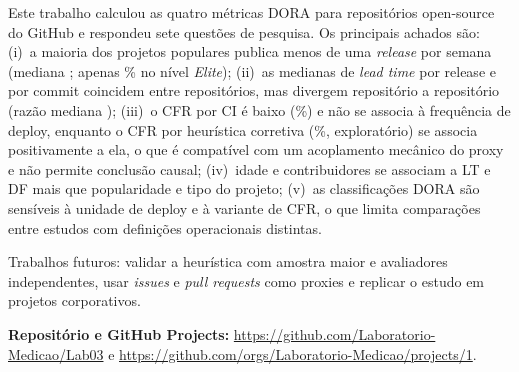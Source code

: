 \documentclass[12pt]{article}
\begin{document}
Este trabalho calculou as quatro métricas DORA para \NTotal{} repositórios open-source do GitHub
e respondeu sete questões de pesquisa. Os principais achados são: (i)~a maioria dos projetos
populares publica menos de uma \textit{release} por semana (mediana \NDfMed{}; apenas \NDfClasseElite\% no
nível \textit{Elite}); (ii)~as medianas de \textit{lead time} por release e por commit coincidem
entre repositórios, mas divergem repositório a repositório (razão mediana \NRazMed{}); (iii)~o CFR por CI é
baixo (\NCfraMed\%) e não se associa à frequência de deploy, enquanto o CFR por heurística corretiva
(\NCfrbMed\%, exploratório) se associa positivamente a ela, o que é compatível com um acoplamento mecânico
do proxy e não permite conclusão causal; (iv)~idade e contribuidores se associam a LT e DF mais que
popularidade e tipo do projeto; (v)~as classificações DORA são sensíveis à unidade de deploy e à variante de
CFR, o que limita comparações entre estudos com definições operacionais distintas.

Trabalhos futuros: validar a heurística com amostra maior e avaliadores independentes, usar \textit{issues} e
\textit{pull requests} como proxies e replicar o estudo em projetos corporativos.

\textbf{Repositório e GitHub Projects:} \url{https://github.com/Laboratorio-Medicao/Lab03} e
\url{https://github.com/orgs/Laboratorio-Medicao/projects/1}.



\end{document}
